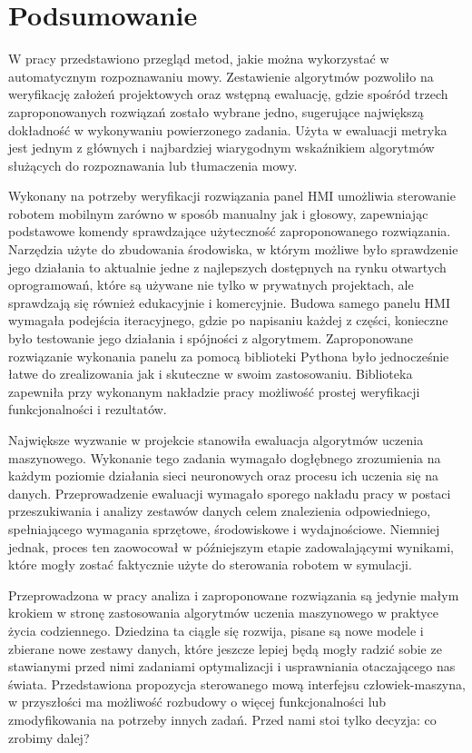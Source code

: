 \chapter{Podsumowanie}
\label{cha:podsumowanie}

W pracy przedstawiono przegląd metod, jakie można wykorzystać w automatycznym rozpoznawaniu mowy. Zestawienie algorytmów pozwoliło na weryfikację założeń projektowych oraz wstępną ewaluację, gdzie spośród trzech zaproponowanych rozwiązań zostało wybrane jedno, sugerujące największą dokładność w wykonywaniu powierzonego zadania. Użyta w ewaluacji metryka jest jednym z głównych i najbardziej wiarygodnym wskaźnikiem algorytmów służących do rozpoznawania lub tłumaczenia mowy.  

Wykonany na potrzeby weryfikacji rozwiązania panel HMI umożliwia sterowanie robotem mobilnym zarówno w sposób manualny jak i głosowy, zapewniając podstawowe komendy sprawdzające użyteczność zaproponowanego rozwiązania. Narzędzia użyte do zbudowania środowiska, w którym możliwe było sprawdzenie jego działania to aktualnie jedne z najlepszych dostępnych na rynku otwartych oprogramowań, które są używane nie tylko w prywatnych projektach, ale sprawdzają się również edukacyjnie i komercyjnie. Budowa samego panelu HMI wymagała podejścia iteracyjnego, gdzie po napisaniu każdej z części, konieczne było testowanie jego działania i spójności z algorytmem. Zaproponowane rozwiązanie wykonania panelu za pomocą biblioteki Pythona było jednocześnie łatwe do zrealizowania jak i skuteczne w swoim zastosowaniu. Biblioteka zapewniła przy wykonanym nakładzie pracy możliwość prostej weryfikacji funkcjonalności i rezultatów.

Największe wyzwanie w projekcie stanowiła ewaluacja algorytmów uczenia maszynowego. Wykonanie tego zadania wymagało dogłębnego zrozumienia na każdym poziomie działania sieci neuronowych oraz procesu ich uczenia się na danych. Przeprowadzenie ewaluacji wymagało sporego nakładu pracy w postaci przeszukiwania i analizy zestawów danych celem znalezienia odpowiedniego, spełniającego wymagania sprzętowe, środowiskowe i wydajnościowe. Niemniej jednak, proces ten zaowocował w późniejszym etapie zadowalającymi wynikami, które mogły zostać faktycznie użyte do sterowania robotem w symulacji. 

Przeprowadzona w pracy analiza i zaproponowane rozwiązania są jedynie małym krokiem w stronę zastosowania algorytmów uczenia maszynowego w praktyce życia codziennego. Dziedzina ta ciągle się rozwija, pisane są nowe modele i zbierane nowe zestawy danych, które jeszcze lepiej będą mogły radzić sobie ze stawianymi przed nimi zadaniami optymalizacji i usprawniania otaczającego nas świata. Przedstawiona propozycja sterowanego mową interfejsu człowiek-maszyna, w przyszłości ma możliwość rozbudowy o więcej funkcjonalności lub zmodyfikowania na potrzeby innych zadań. Przed nami stoi tylko decyzja: co zrobimy dalej?
